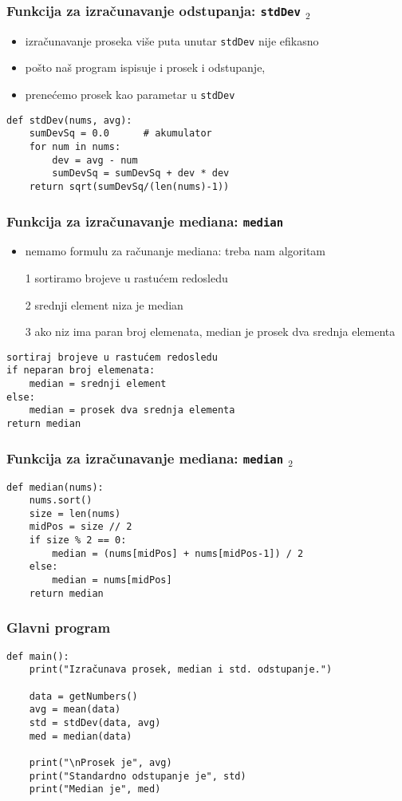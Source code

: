 \documentclass[utf8,compress,aspectratio=169]{beamer}
\begin{document}
\begin{frame}[fragile]
  \frametitle{Funkcija za izračunavanje odstupanja: \texttt{stdDev} $_2$}
  \begin{itemize}
    \item izračunavanje proseka više puta unutar \texttt{stdDev} nije efikasno
    \item pošto naš program ispisuje i prosek i odstupanje,
    \item prenećemo prosek kao parametar u \texttt{stdDev}
  \end{itemize}
\begin{verbatim}
def stdDev(nums, avg):
    sumDevSq = 0.0      # akumulator
    for num in nums:
        dev = avg - num
        sumDevSq = sumDevSq + dev * dev
    return sqrt(sumDevSq/(len(nums)-1))
\end{verbatim}
\end{frame}

\begin{frame}[fragile]
  \frametitle{Funkcija za izračunavanje mediana: \texttt{median}}
  \begin{itemize}
    \item nemamo formulu za računanje mediana: treba nam algoritam
    \item[1] sortiramo brojeve u rastućem redosledu
    \item[2] srednji element niza je median
    \item[3] ako niz ima paran broj elemenata, median je prosek dva srednja elementa
  \end{itemize}
\begin{verbatim}
sortiraj brojeve u rastućem redosledu
if neparan broj elemenata:
    median = srednji element
else:
    median = prosek dva srednja elementa
return median
\end{verbatim}
\end{frame}

\begin{frame}[fragile]
  \frametitle{Funkcija za izračunavanje mediana: \texttt{median} $_2$}
\begin{verbatim}
def median(nums):
    nums.sort()
    size = len(nums)
    midPos = size // 2
    if size % 2 == 0:
        median = (nums[midPos] + nums[midPos-1]) / 2
    else:
        median = nums[midPos]
    return median
\end{verbatim}
\end{frame}

\begin{frame}[fragile]
  \frametitle{Glavni program}
\begin{verbatim}
def main():
    print("Izračunava prosek, median i std. odstupanje.")

    data = getNumbers()
    avg = mean(data)
    std = stdDev(data, avg)
    med = median(data)

    print("\nProsek je", avg)
    print("Standardno odstupanje je", std)
    print("Median je", med)
\end{verbatim}
\end{frame}
\end{document}
